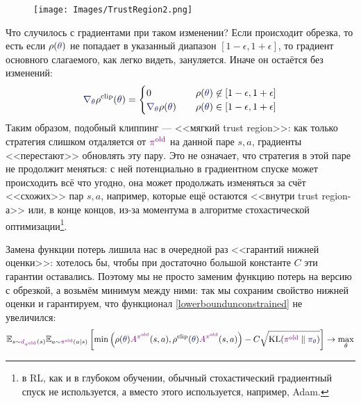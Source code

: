 \begin{figure}
\vspace{-0.5cm}
\centering
\texttt{[image: Images/TrustRegion2.png]}
\vspace{-0.5cm}
\end{figure}
Что случилось с градиентами при таком изменении? Если происходит обрезка, то есть если $\rho(\textcolor{ChadBlue}{\theta})$ не попадает в указанный диапазон $[1 - \epsilon, 1 + \epsilon]$, то градиент основного слагаемого, как легко видеть, зануляется. Иначе он остаётся без изменений:
$$\textcolor{ChadBlue}{\nabla_\theta} \rho^{\clip}(\textcolor{ChadBlue}{\theta}) = 
\begin{cases}
0 \quad &\rho(\textcolor{ChadBlue}{\theta}) \not\in [1 - \epsilon, 1 + \epsilon] \\
\textcolor{ChadBlue}{\nabla_\theta} \rho(\textcolor{ChadBlue}{\theta}) \quad &\rho(\textcolor{ChadBlue}{\theta}) \in [1 - \epsilon, 1 + \epsilon] \\
\end{cases}
$$
Таким образом, подобный клиппинг --- <<мягкий trust region>>: как только стратегия слишком отдаляется от $\textcolor{ChadPurple}{\pi^{\old}}$ на данной паре $s, a$, градиенты <<перестают>> обновлять эту пару. Это не означает, что стратегия в этой паре не продолжит меняться: с ней потенциально в градиентном спуске может происходить всё что угодно, она может продолжать изменяться за счёт <<схожих>> пар $s, a$, например, которые ещё остаются <<внутри trust region-а>> или, в конце концов, из-за моментума в алгоритме стохастической оптимизации\footnote{в RL, как и в глубоком обучении, обычный стохастический градиентный спуск не используется, а вместо этого используется, например, Adam.}.

Замена функции потерь лишила нас в очередной раз <<гарантий нижней оценки>>: хотелось бы, чтобы при достаточно большой константе $C$ эти гарантии оставались. Поэтому мы не просто заменим функцию потерь на версию с обрезкой, а возьмём минимум между ними: так мы сохраним свойство нижней оценки и гарантируем, что функционал \eqref{lowerboundunconstrained} не увеличился: 
\begin{equation}\label{PPOlowerbound}
\E_{s \sim \textcolor{ChadPurple}{d_{\pi^{\old}}}(s)} \E_{a \sim \textcolor{ChadPurple}{\pi^{\old}}(a \mid s)}  \left[ \min \left( \rho(\textcolor{ChadBlue}{\theta}) \textcolor{ChadPurple}{A^{\pi^{\old}}}(s, a), \rho^{\clip}(\textcolor{ChadBlue}{\theta}) \textcolor{ChadPurple}{A^{\pi^{\old}}}(s, a)\right) - C \sqrt{\KL(\textcolor{ChadPurple}{\pi^{\old}} \parallel \textcolor{ChadBlue}{\pi_\theta})} \right] \to \max_\theta
\end{equation}


